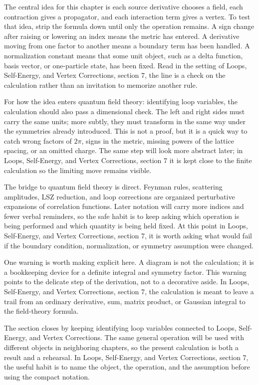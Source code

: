 The central idea for this chapter is each source derivative chooses a field, each contraction gives a propagator, and each interaction term gives a vertex.  To test that idea, strip the formula down until only the operation remains.  A sign change after raising or lowering an index means the metric has entered.  A derivative moving from one factor to another means a boundary term has been handled.  A normalization constant means that some unit object, such as a delta function, basis vector, or one-particle state, has been fixed.  Read in the setting of Loops, Self-Energy, and Vertex Corrections, section 7, the line is a check on the calculation rather than an invitation to memorize another rule.

For how the idea enters quantum field theory: identifying loop variables, the calculation should also pass a dimensional check.  The left and right sides must carry the same units; more subtly, they must transform in the same way under the symmetries already introduced.  This is not a proof, but it is a quick way to catch wrong factors of \(2\pi\), signs in the metric, missing powers of the lattice spacing, or an omitted charge.  The same step will look more abstract later; in Loops, Self-Energy, and Vertex Corrections, section 7 it is kept close to the finite calculation so the limiting move remains visible.

The bridge to quantum field theory is direct.  Feynman rules, scattering amplitudes, LSZ reduction, and loop corrections are organized perturbative expansions of correlation functions.  Later notation will carry more indices and fewer verbal reminders, so the safe habit is to keep asking which operation is being performed and which quantity is being held fixed.  At this point in Loops, Self-Energy, and Vertex Corrections, section 7, it is worth asking what would fail if the boundary condition, normalization, or symmetry assumption were changed.

One warning is worth making explicit here.  A diagram is not the calculation; it is a bookkeeping device for a definite integral and symmetry factor.  This warning points to the delicate step of the derivation, not to a decorative aside.  In Loops, Self-Energy, and Vertex Corrections, section 7, the calculation is meant to leave a trail from an ordinary derivative, sum, matrix product, or Gaussian integral to the field-theory formula.

The section closes by keeping identifying loop variables connected to Loops, Self-Energy, and Vertex Corrections.  The same general operation will be used with different objects in neighboring chapters, so the present calculation is both a result and a rehearsal.  In Loops, Self-Energy, and Vertex Corrections, section 7, the useful habit is to name the object, the operation, and the assumption before using the compact notation.



